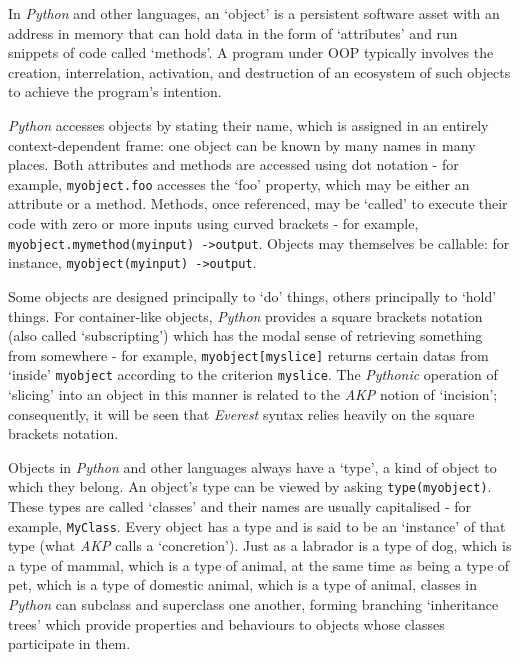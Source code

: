 \documentclass[a4paper,11pt,oneside]{book}
\begin{document}
In \textit{Python} and other languages, an `object' is a persistent software asset with an address in memory that can hold data in the form of `attributes' and run snippets of code called `methods'. A program under OOP typically involves the creation, interrelation, activation, and destruction of an ecosystem of such objects to achieve the program's intention.

\textit{Python} accesses objects by stating their name, which is assigned in an entirely context-dependent frame: one object can be known by many names in many places. Both attributes and methods are accessed using dot notation - for example, \texttt{myobject.foo} accesses the `foo' property, which may be either an attribute or a method. Methods, once referenced, may be `called' to execute their code with zero or more inputs using curved brackets - for example, \texttt{myobject.mymethod(myinput) -\textgreater  output}. Objects may themselves be callable: for instance, \texttt{myobject(myinput) -\textgreater  output}.

Some objects are designed principally to `do' things, others principally to `hold' things. For container-like objects, \textit{Python} provides a square brackets notation (also called `subscripting') which has the modal sense of retrieving something from somewhere - for example, \texttt{myobject[myslice]} returns certain datas from `inside' \texttt{myobject} according to the criterion \texttt{myslice}. The \textit{Pythonic} operation of `slicing' into an object in this manner is related to the \textit{AKP} notion of `incision'; consequently, it will be seen that \textit{Everest} syntax relies heavily on the square brackets notation.

Objects in \textit{Python} and other languages always have a `type', a kind of object to which they belong. An object's type can be viewed by asking \texttt{type(myobject)}. These types are called `classes' and their names are usually capitalised - for example, \texttt{MyClass}. Every object has a type and is said to be an `instance' of that type (what \textit{AKP} calls a `concretion'). Just as a labrador is a type of dog, which is a type of mammal, which is a type of animal, at the same time as being a type of pet, which is a type of domestic animal, which is a type of animal, classes in \textit{Python} can subclass and superclass one another, forming branching `inheritance trees' which provide properties and behaviours to objects whose classes participate in them.
\end{document}
